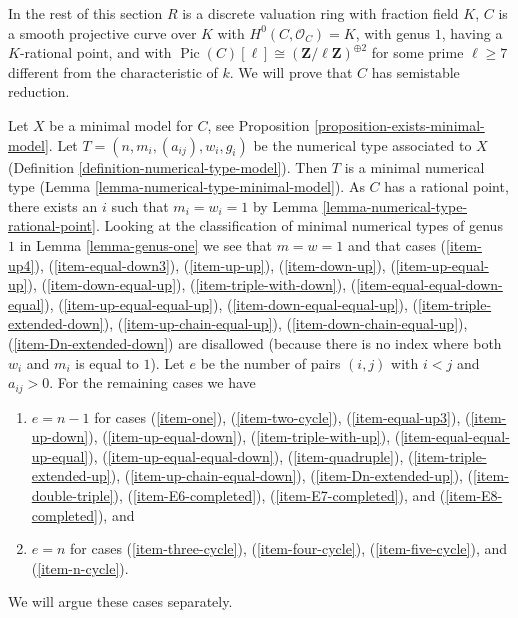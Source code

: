 \documentclass{stacks-project}
\theoremstyle{plain}
\theoremstyle{definition}
\theoremstyle{remark}
\numberwithin{equation}{subsection}
\def\Pic{\mathop{\mathrm{Pic}}\nolimits}
\begin{document}
\medskip\noindent
In the rest of this section
$R$ is a discrete valuation ring with fraction field $K$,
$C$ is a smooth projective curve over $K$ with $H^0(C, \mathcal{O}_C) = K$,
with genus $1$, having a $K$-rational point, and with
$\Pic(C)[\ell] \cong (\mathbf{Z}/\ell \mathbf{Z})^{\oplus 2}$
for some prime $\ell \geq 7$ different from the characteristic of $k$.
We will prove that $C$ has semistable reduction.

\medskip\noindent
Let $X$ be a minimal model for $C$, see
Proposition \ref{proposition-exists-minimal-model}.
Let $T = (n, m_i, (a_{ij}), w_i, g_i)$
be the numerical type associated to $X$
(Definition \ref{definition-numerical-type-model}).
Then $T$ is a minimal numerical type
(Lemma \ref{lemma-numerical-type-minimal-model}).
As $C$ has a rational point, there exists an $i$
such that $m_i = w_i = 1$ by Lemma \ref{lemma-numerical-type-rational-point}.
Looking at the classification of minimal numerical types
of genus $1$ in Lemma \ref{lemma-genus-one}
we see that $m = w = 1$ and that cases
(\ref{item-up4}),
(\ref{item-equal-down3}),
(\ref{item-up-up}),
(\ref{item-down-up}),
(\ref{item-up-equal-up}),
(\ref{item-down-equal-up}),
(\ref{item-triple-with-down}),
(\ref{item-equal-equal-down-equal}),
(\ref{item-up-equal-equal-up}),
(\ref{item-down-equal-equal-up}),
(\ref{item-triple-extended-down}),
(\ref{item-up-chain-equal-up}),
(\ref{item-down-chain-equal-up}),
(\ref{item-Dn-extended-down}) are disallowed (because there is no
index where both $w_i$ and $m_i$ is equal to $1$).
Let $e$ be the number of pairs $(i, j)$ with $i < j$ and
$a_{ij} > 0$. For the remaining cases we have
\begin{enumerate}
\item[(A)] $e = n - 1$ for cases
(\ref{item-one}),
(\ref{item-two-cycle}),
(\ref{item-equal-up3}),
(\ref{item-up-down}),
(\ref{item-up-equal-down}),
(\ref{item-triple-with-up}),
(\ref{item-equal-equal-up-equal}),
(\ref{item-up-equal-equal-down}),
(\ref{item-quadruple}),
(\ref{item-triple-extended-up}),
(\ref{item-up-chain-equal-down}),
(\ref{item-Dn-extended-up}),
(\ref{item-double-triple}),
(\ref{item-E6-completed}),
(\ref{item-E7-completed}), and
(\ref{item-E8-completed}), and
\item[(B)] $e = n$ for cases
(\ref{item-three-cycle}),
(\ref{item-four-cycle}),
(\ref{item-five-cycle}), and
(\ref{item-n-cycle}).
\end{enumerate}
We will argue these cases separately.
\end{document}
